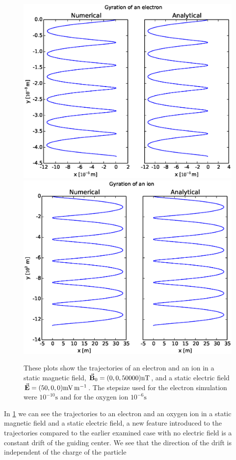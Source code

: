 \documentclass[x11names]{article}
\begin{document}
      \begin{figure}
            \includegraphics[width = 0.5\linewidth]{../source/ExBelectron}
            \includegraphics[width = 0.5\linewidth]{../source/ExBion}
            \caption{These plots show the trajectories of an electron and an ion in a static magnetic field, \(\va{B}_0 = (0,0,50000) \si{\nano\tesla}\), and a static electric field \( \va{E} = (50,0,0)  \si{\milli\volt\per\meter}\). The stepsize used for the electron simulation were \(10^{-10} \si{\second}\) and for the oxygen ion \(10^{-6} \si{\second}\)}
            \label{fig:ExBDrift}
      \end{figure}

      In \cref{fig:ExBDrift} we can see the trajectories to an electron and an oxygen ion in a static magnetic field and a static electric field, a new feature introduced to the trajectories compared to the earlier examined case with no electric field is a constant drift of the guiding center. We see that the direction of the drift is independent of the charge of the particle 
\end{document}
